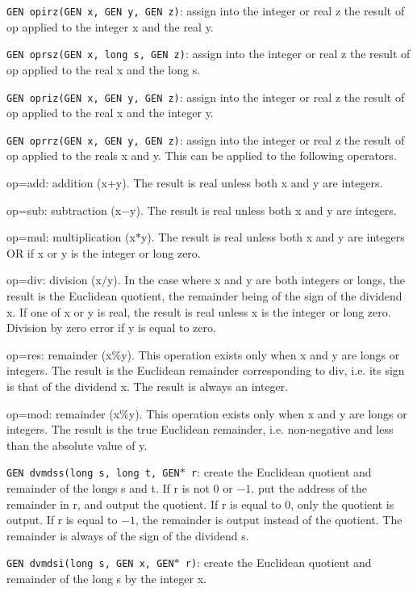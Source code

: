 {\tt GEN opirz(GEN x, GEN y, GEN z)}: assign into the integer or real z
the result of op applied to the integer x and the real y.

{\tt GEN oprsz(GEN x, long s, GEN z)}: assign into the integer or real z
the result of op applied to the real x and the long s.

{\tt GEN opriz(GEN x, GEN y, GEN z)}: assign into the integer or real z
the result of op applied to the real x and the integer y.

{\tt GEN oprrz(GEN x, GEN y, GEN z)}: assign into the integer or real z
the result of op applied to the reals x and y.
\smallskip
This can be applied to the following operators.

op=add: addition (x$+$y). The result is real unless both x and y are
integers.

op=sub: subtraction (x$-$y). The result is real unless both x and y are
integers.

op=mul: multiplication (x$*$y). The result is real unless both x and y are
integers OR if x or y is the integer or long zero.

op=div: division (x$/$y). In the case where x and y are both integers or longs,
the result is the Euclidean quotient, the remainder being of the sign of the
dividend x. If one of x or y is real, the result is real unless x is the
integer or long zero. Division by zero error if y is equal to zero.

op=res: remainder (x$\%$y). This operation exists only when x and y are longs
or integers. The result is the Euclidean remainder corresponding to div, i.e.
its sign is that of the dividend x. The result is always an integer.

op=mod: remainder (x$\%$y). This operation exists only when x and y are longs
or integers. The result is the true Euclidean remainder, i.e. non-negative
and less than the absolute value of y.


{\tt GEN dvmdss(long s, long t, GEN$*$ r}: create the Euclidean quotient and
remainder of the longs s and t. If r is not 0 or $-1$. put the address of the
remainder in r, and output the quotient. If r is equal to 0, only the
quotient is output. If r is equal to $-1$, the remainder is output instead
of the quotient. The remainder is always of the sign of the dividend s.

{\tt GEN dvmdsi(long s, GEN x, GEN$*$ r)}: create the Euclidean quotient and
remainder of the long s by the integer x.

